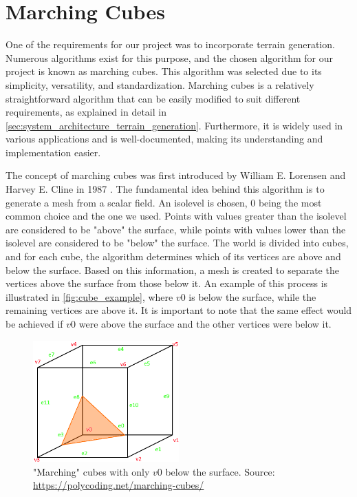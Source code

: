 \section{Marching Cubes} \label{sec:theory_theory_marching_cubes}
One of the requirements for our project was to incorporate terrain generation.
Numerous algorithms exist for this purpose, and the chosen algorithm for our project is known as marching cubes.
This algorithm was selected due to its simplicity, versatility, and standardization.
Marching cubes is a relatively straightforward algorithm that can be easily modified to suit different requirements, as explained in detail in \autoref{sec:system_architecture_terrain_generation}.
Furthermore, it is widely used in various applications and is well-documented, making its understanding and implementation easier.

The concept of marching cubes was first introduced by William E. Lorensen and Harvey E. Cline in 1987 \cite{Marching-Cubes}.
The fundamental idea behind this algorithm is to generate a mesh from a scalar field.
An isolevel is chosen, 0 being the most common choice and the one we used.
Points with values greater than the isolevel are considered to be "above" the surface, while points with values lower than the isolevel are considered to be "below" the surface.
The world is divided into cubes, and for each cube, the algorithm determines which of its vertices are above and below the surface.
Based on this information, a mesh is created to separate the vertices above the surface from those below it.
An example of this process is illustrated in \autoref{fig:cube_example}, where $v0$ is below the surface, while the remaining vertices are above it.
It is important to note that the same effect would be achieved if $v0$ were above the surface and the other vertices were below it.

\begin{figure}[H]
    \centering
    \includegraphics[width=0.5\textwidth]{chapters/theoretical_foundations/sections/marching_cubes/resources/cube-example.png}
    \caption["Marching" cubes with only $v0$ below the surface.]{"Marching" cubes with only $v0$ below the surface. Source: \url{https://polycoding.net/marching-cubes/}}
    \label{fig:cube_example}
\end{figure}

